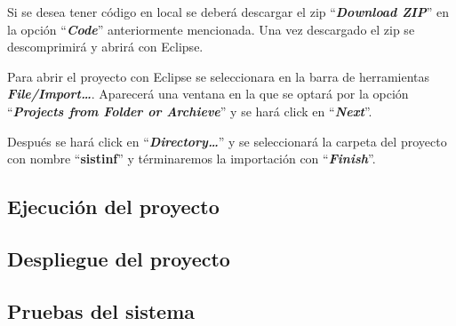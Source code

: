 
Si se desea tener código en local se deberá descargar el zip ``\textbf{\textit{Download ZIP}}'' en la opción ``\textbf{\textit{Code}}'' anteriormente mencionada. Una vez descargado el zip se descomprimirá y abrirá con Eclipse. 

Para abrir el proyecto con Eclipse se seleccionara en la barra de herramientas \textbf{\textit{File/Import\dots}}. Aparecerá una ventana en la que se optará por la opción ``\textbf{\textit{Projects from Folder or Archieve}}'' y se hará click en ``\textbf{\textit{Next}}''.

Después se hará click en ``\textbf{\textit{Directory\dots}}'' y se seleccionará la carpeta del proyecto con nombre ``\textbf{sistinf}'' y términaremos la importación con ``\textbf{\textit{Finish}}''.
	
\subsection{Ejecución del proyecto}

\subsection{Despliegue del proyecto}

\subsection{Pruebas del sistema}
